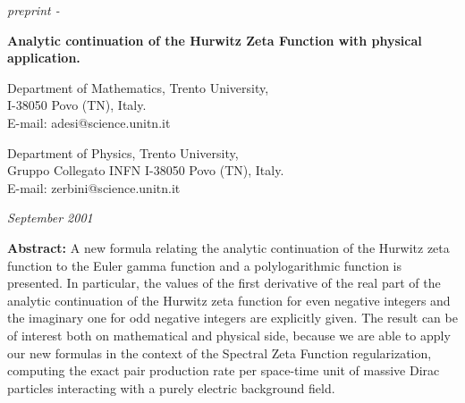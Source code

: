 \documentclass [11pt]{article}
\begin{document}

\hfill{\sl preprint -  }
\par
\bigskip
\par
\rm



\par
\bigskip
\LARGE
\noindent
{\bf }
\bigskip
\par
\rm
\normalsize

\par
\bigskip
\LARGE
\noindent
{\bf Analytic continuation of the Hurwitz Zeta Function
with physical application.}
\bigskip
\par
\rm
\normalsize

\large
{}

\large
\smallskip

\noindent
Department of Mathematics,
Trento University,\\
I-38050 Povo (TN), Italy.\\
E-mail: adesi@science.unitn.it\\

\large
{}

\large
\smallskip

\noindent
Department of Physics,
Trento University,\\ 
Gruppo Collegato INFN 
I-38050 Povo (TN), Italy.\\
E-mail: zerbini@science.unitn.it\\


\rm\normalsize





\par
\bigskip
\par
\hfill{\sl September 2001}
\par
\medskip
\par\rm


\noindent
{\bf Abstract:}
A new formula relating the analytic continuation of
the Hurwitz zeta function to the Euler gamma function and a polylogarithmic function is presented. In particular,  the values of the first derivative of the 
real 
part of the analytic continuation of the Hurwitz zeta
function for even negative integers and the imaginary one for odd negative integers are explicitly given.
The result can be of interest both on mathematical and physical side, because 
we are able to apply our new formulas in the context
of the Spectral Zeta Function regularization,  computing the exact pair production rate per space-time unit of
massive Dirac particles interacting with a purely electric background field.
\end{document}
